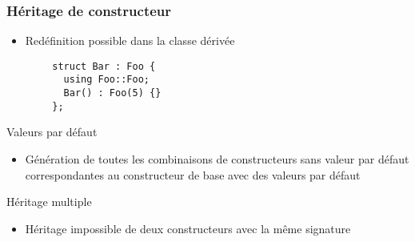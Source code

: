 \documentclass[C++.tex]{subfiles}
\begin{document}
\begin{frame}[fragile]
	\frametitle{Héritage de constructeur}
	\begin{itemize}
		\item Redéfinition possible dans la classe dérivée
	\end{itemize}

	\begin{verbatim}
		struct Bar : Foo {
		  using Foo::Foo;
		  Bar() : Foo(5) {}
		};
	\end{verbatim}

	\begin{alertblock}{Valeurs par défaut}
		\begin{itemize}
			\item Génération de toutes les combinaisons de constructeurs sans valeur par défaut correspondantes au constructeur de base avec des valeurs par défaut
		\end{itemize}

	\end{alertblock}

	\begin{alertblock}{Héritage multiple}
		\begin{itemize}
			\item Héritage impossible de deux constructeurs avec la même signature
		\end{itemize}
	\end{alertblock}

\end{frame}
\end{document}
